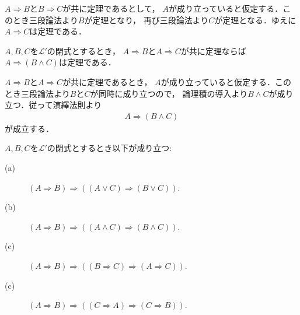 	\begin{prf}
		$A \Longrightarrow B$と$B \Longrightarrow C$が共に定理であるとして，
		$A$が成り立っていると仮定する．このとき三段論法より$B$が定理となり，
		再び三段論法より$C$が定理となる．ゆえに$A \Longrightarrow C$は定理である．
		\QED
	\end{prf}
	
	\begin{screen}
		\begin{logicalthm}[二式が同時に導かれるならその論理積が導かれる]
		\label{logicalthm:conjunction_of_consequences}
			$A,B,C$を$\mathcal{L}'$の閉式とするとき，
			$A \Longrightarrow B$と$A \Longrightarrow C$が共に定理ならば
			$A \Longrightarrow (B \wedge C)$は定理である．
		\end{logicalthm}
	\end{screen}
	
	\begin{prf}
		$A \Longrightarrow B$と$A \Longrightarrow C$が共に定理であるとき，
		$A$が成り立っていると仮定する．このとき三段論法より$B$と$C$が同時に成り立つので，
		論理積の導入より$B \wedge C$が成り立つ．従って演繹法則より
		\begin{align}
			A \Longrightarrow (B \wedge C)
		\end{align}
		が成立する．
		\QED
	\end{prf}
	
	\begin{screen}
		\begin{logicalthm}[含意は遺伝する]\label{logicalthm:rule_of_inference_1}
			$A,B,C$を$\mathcal{L}'$の閉式とするとき以下が成り立つ:
			\begin{description}
				\item[(a)] $(A \Longrightarrow B) \Longrightarrow ( (A \vee C) \Longrightarrow (B \vee C) )$.
				
				\item[(b)] $(A \Longrightarrow B) \Longrightarrow ( (A \wedge C) \Longrightarrow (B \wedge C) )$.
				
				\item[(c)] $(A \Longrightarrow B) \Longrightarrow ( (B \Longrightarrow C) \Longrightarrow (A \Longrightarrow C) )$.
				
				\item[(c)] $(A \Longrightarrow B) \Longrightarrow ( (C \Longrightarrow A) \Longrightarrow (C \Longrightarrow B) )$.
			\end{description}
		\end{logicalthm}
	\end{screen}
	
